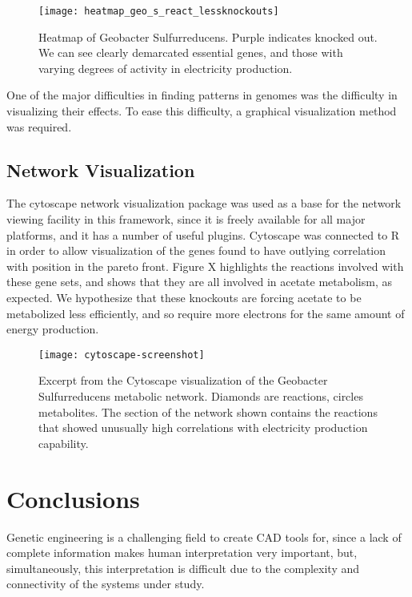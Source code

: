 \documentclass[a4paper,twocolumn]{article}
\begin{document}
\begin{figure}[h]
\texttt{[image: heatmap\_geo\_s\_react\_lessknockouts]}
\caption{Heatmap of Geobacter Sulfurreducens. Purple indicates knocked out. We can see clearly demarcated essential genes, and those with varying degrees of activity in electricity production.}
\end{figure}

One of the major difficulties in finding patterns in genomes was the difficulty in visualizing their effects. To ease this difficulty, a graphical visualization method was required.

\subsection{Network Visualization}
The cytoscape network visualization package was used as a base for the network viewing facility in this framework, since it is freely available for all major platforms, and it has a number of useful plugins. Cytoscape was connected to R in order to allow visualization of the genes found to have outlying correlation with position in the pareto front. Figure X highlights the reactions involved with these gene sets, and shows that they are all involved in acetate metabolism, as expected. We hypothesize that these knockouts are forcing acetate to be metabolized less efficiently, and so require more electrons for the same amount of energy production.

\begin{figure}[h]
\texttt{[image: cytoscape-screenshot]}
\caption{Excerpt from the Cytoscape visualization of the Geobacter Sulfurreducens metabolic network. Diamonds are reactions, circles metabolites. The section of the network shown contains the reactions that showed unusually high correlations with electricity production capability.}
\end{figure}

\section{Conclusions}

Genetic engineering is a challenging field to create CAD tools for, since a lack of complete information makes human interpretation very important, but, simultaneously, this interpretation is difficult due to the complexity and connectivity of the systems under study. 
\end{document}

